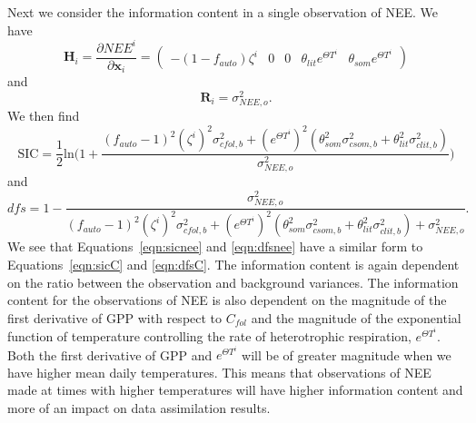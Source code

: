 \documentclass[11pt]{article}
\begin{document}
Next we consider the information content in a single observation of NEE. We have
\begin{equation}
\textbf{H}_{i} = \frac{\partial NEE^{i}}{\partial \textbf{x}_{i}} =
\begin{pmatrix}
-(1-f_{auto})\zeta^i & 0 & 0 & \theta_{lit} e^{\Theta T^{i}} & \theta_{som} e^{\Theta T^{i}}
\end{pmatrix}
\end{equation}
and
\begin{equation}
\mathbf{R}_i = \sigma_{NEE,o}^{2}.
\end{equation}
We then find
\begin{equation}
\text{SIC} = \frac{1}{2}\text{ln}\Bigg(1 + \frac{(f_{auto}-1)^{2}(\zeta^{i})^{2}\sigma_{cfol,b}^{2} + (e^{\Theta T^{i}})^2(\theta_{som}^2\sigma_{csom,b}^2+\theta_{lit}^2\sigma_{clit,b}^2)}{\sigma_{NEE,o}^{2}}\Bigg) \label{eqn:sicnee}
\end{equation}
and
\begin{equation}
dfs = 1 - \frac{\sigma_{NEE,o}^{2}}{(f_{auto}-1)^{2}(\zeta^{i})^{2}\sigma_{cfol,b}^{2}+(e^{\Theta T^{i}})^2(\theta_{som}^2\sigma_{csom,b}^2+\theta_{lit}^2\sigma_{clit,b}^2) +\sigma_{NEE,o}^{2}}. \label{eqn:dfsnee}
\end{equation}
We see that Equations~\eqref{eqn:sicnee} and \eqref{eqn:dfsnee} have a similar form to Equations~\eqref{eqn:sicC} and \eqref{eqn:dfsC}. The information content is again dependent on the ratio between the observation and background variances. The information content for the observations of NEE is also dependent on the magnitude of the first derivative of GPP with respect to \(C_{fol}\) and the magnitude of the exponential function of temperature controlling the rate of heterotrophic respiration, \(e^{\Theta T^{i}}\). Both the first derivative of GPP and  \(e^{\Theta T^{i}}\) will be of greater magnitude when we have higher mean daily temperatures. This means that observations of NEE made at times with higher temperatures will have higher information content and more of an impact on data assimilation results.
\end{document}
